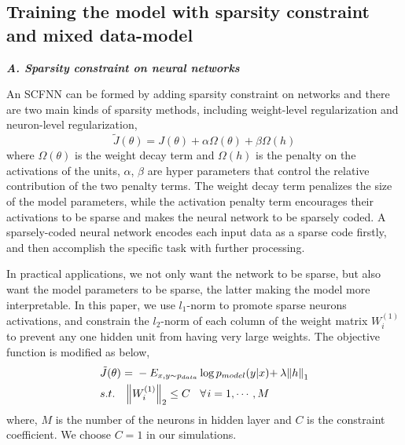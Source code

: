 \subsection{Training the model with sparsity constraint and mixed data-model}
\emph{\textbf{A. Sparsity constraint on neural networks}}

An SCFNN can be formed by adding sparsity constraint on networks and there are two main kinds of sparsity methods, including weight-level regularization and neuron-level regularization\cite{goodfellow2016deep},
\begin{equation}
\tilde J(\theta) = J(\theta) + \alpha \Omega (\theta )+ \beta \Omega (h)
\end{equation}
where $\Omega (\theta )$ is the weight decay term and $\Omega (h)$ is the penalty on the activations of the units, $\alpha$, $\beta$ are hyper parameters that control the relative contribution of
the two penalty terms. The weight decay term penalizes the size of the model parameters, while the activation penalty term encourages their activations to be sparse and makes the neural network to be sparsely coded.
A sparsely-coded neural network encodes each input data as a sparse code firstly, and then accomplish the specific task with further processing.

In practical applications, we not only want the network to be sparse, but also want the model parameters to be sparse, the latter making the model more interpretable. In this paper, we use $l_{1}$-norm to promote sparse neurons activations, and constrain the $l_{2}$-norm of each column of the weight matrix ${{W^{(1)}_i}}$ to prevent any one hidden unit from having very large weights. The objective function is modified as below,
\begin{equation}
\begin{split}
&\tilde J(\theta ){\kern 1pt} {\kern 1pt} {\kern 1pt} {\rm{ = }}{\kern 1pt} {\kern 1pt} {\kern 1pt}  - {E_{x,y \sim {p_{data}}}}\log {p_{model}}(y|x){\rm{ + }}{\kern 1pt} {\kern 1pt} \lambda {\left\| h \right\|_1}\\
& s.t.{\kern 1pt} {\kern 1pt} {\kern 1pt} {\kern 1pt} {\kern 1pt} {\kern 1pt} {\kern 1pt} {\kern 1pt} {\kern 1pt} {\kern 1pt} {\left\| {{W^{(1)}_i}} \right\|_2} \le C{\kern 1pt} {\kern 1pt} {\kern 1pt} {\kern 1pt} {\kern 1pt} {\kern 1pt} {\kern 1pt} {\kern 1pt} {\kern 1pt} \forall {\kern 1pt} i = 1, \cdots ,M\\
\end{split}
\end{equation}
where, $M$ is the number of the neurons in hidden layer and $C$ is the constraint coefficient. We choose $C=1$ in our simulations.

